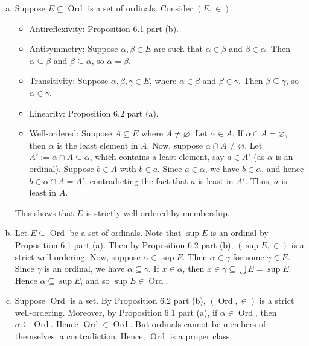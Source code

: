 \documentclass[10pt]{article}
\makeatletter
\DeclareMathOperator{\Ord}{Ord}
\theoremstyle{newstyle}
\newenvironment{pf}[1][\proofname]{\par
  \pushQED{\qed}%
  \normalfont \topsep0\p@\relax
  \trivlist
  \item[\hskip\labelsep\scshape
  #1\@addpunct{.}]\ignorespaces
}{%
  \popQED\endtrivlist\@endpefalse
}
\makeatother
\begin{document}
\begin{pf}
\begin{enumerate}[(a)]
    \item Suppose $E \subseteq \Ord$ is a set of ordinals. Consider $(E, \in)$. 
    \begin{itemize}
        \item Antireflexivity: Proposition 6.1 part (b). 
        \item Antisymmetry: Suppose $\alpha, \beta \in E$ are such that $\alpha \in \beta$ and 
        $\beta \in \alpha$. Then $\alpha \subseteq \beta$ and $\beta \subseteq \alpha$, so 
        $\alpha = \beta$. 
        \item Transitivity: Suppose $\alpha, \beta, \gamma \in E$, where $\alpha \in \beta$ and 
        $\beta \in \gamma$. Then $\beta \subseteq \gamma$, so $\alpha \in \gamma$. 
        \item Linearity: Proposition 6.2 part (a). 
        \item Well-ordered: Suppose $A \subseteq E$ where $A \neq \varnothing$. Let 
        $\alpha \in A$. If $\alpha \cap A = \varnothing$, then $\alpha$ is the least element in $A$. 
        Now, suppose $\alpha \cap A \neq \varnothing$. Let $A' := \alpha \cap A \subseteq \alpha$, 
        which contains a least element, say $a \in A'$ (as $\alpha$ is an ordinal). Suppose $b \in A$ with $b \in a$. Since 
        $a \in \alpha$, we have $b \in \alpha$, and hence $b \in \alpha \cap A = A'$, contradicting 
        the fact that $a$ is least in $A'$. Thus, $a$ is least in $A$.
    \end{itemize}
    This shows that $E$ is strictly well-ordered by membership.
    
    \item Let $E \subseteq \Ord$ be a set of ordinals. Note that $\sup E$ is an ordinal by 
    Proposition 6.1 part (a). Then by Proposition 6.2 part (b), $(\sup E, \in)$ is a strict 
    well-ordering. Now, suppose $\alpha \in \sup E$. Then $\alpha \in \gamma$ for some 
    $\gamma \in E$. Since $\gamma$ is an ordinal, we have $\alpha \subseteq \gamma$. 
    If $x \in \alpha$, then $x \in \gamma \subseteq \bigcup E = \sup E$. Hence 
    $\alpha \subseteq \sup E$, and so $\sup E \in \Ord$.
    
    \item Suppose $\Ord$ is a set. By Proposition 6.2 part (b), $(\Ord, \in)$ is a 
    strict well-ordering. Moreover, by Proposition 6.1 part (a), if $\alpha \in \Ord$, then 
    $\alpha \subseteq \Ord$. Hence $\Ord \in \Ord$. But ordinals cannot be members of themselves, 
    a contradiction. Hence, $\Ord$ is a proper class. \qedhere
\end{enumerate} 
\end{pf}
\end{document}
